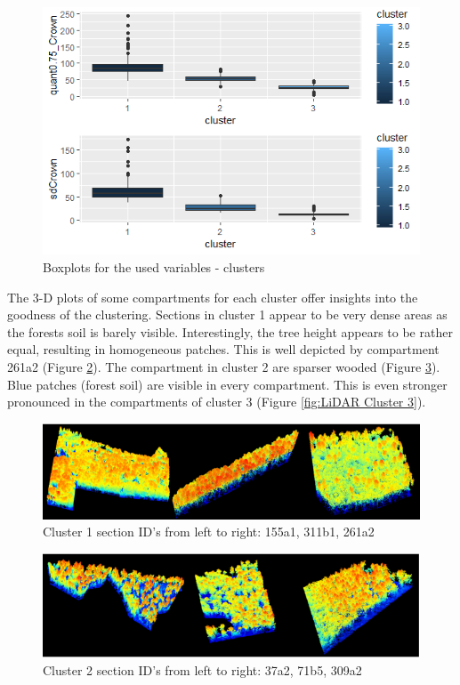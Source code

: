 \begin{figure}[H]
\centering
  \includegraphics[scale = 0.85]{boxplots_cluster.png}
  \caption{Boxplots for the used variables - clusters}
  \label{fig:Boxplots Cluster}
\end{figure}


The 3-D plots of some compartments for each cluster offer insights into the goodness of the clustering. Sections in
cluster 1 appear to be very dense areas as the forests soil is barely visible. Interestingly, the tree height appears
to be rather equal, resulting in homogeneous patches. This is well depicted by compartment 261a2 (Figure \ref{fig:LiDAR Cluster 1}). The
compartment in cluster 2 are sparser wooded (Figure \ref{fig:LiDAR Cluster 2}). Blue patches (forest soil) are visible in every compartment. This is even
stronger pronounced in the compartments of cluster 3 (Figure \ref{fig:LiDAR Cluster 3}).


\begin{figure}[H]
  \includegraphics[width=\textwidth]{cluster1_lidar.png}
  \caption{Cluster 1 section ID's from left to right: 155a1, 311b1, 261a2}
  \label{fig:LiDAR Cluster 1}
\end{figure}

\begin{figure}[H]
  \includegraphics[width=\textwidth]{cluster2_lidar.png}
  \caption{Cluster 2 section ID's from left to right: 37a2, 71b5, 309a2}
  \label{fig:LiDAR Cluster 2}
\end{figure}

